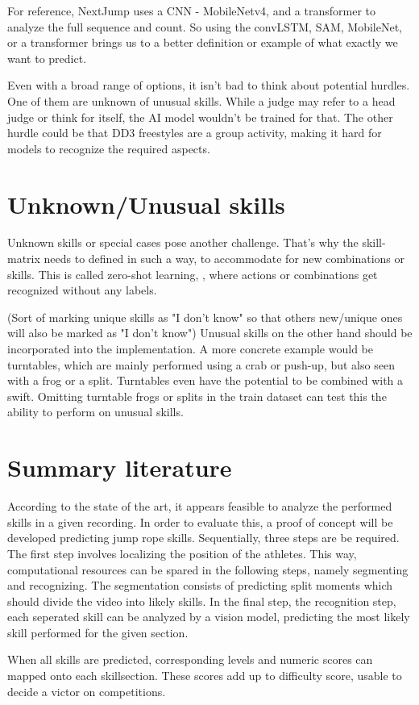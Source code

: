 For reference, NextJump uses a CNN - MobileNetv4, \autocite{MobileNetv4_2024} and a transformer to analyze the full sequence and count. So using the convLSTM, SAM, MobileNet, or a transformer brings us to a better definition or example of what exactly we want to predict.


Even with a broad range of options, it isn't bad to think about potential hurdles. One of them are unknown of unusual skills. While a judge may refer to a head judge or think for itself, the AI model wouldn't be trained for that. The other hurdle could be that DD3 freestyles are a group activity, making it hard for models to recognize the required aspects. 


\section{Unknown/Unusual skills}
\label{lit:unknown-unusual-skills}

Unknown skills or special cases pose another challenge. That's why the skill-matrix needs to defined in such a way, to accommodate for new combinations or skills. This is called zero-shot learning, \autocite{Pourpanah_2022}, where actions or combinations get recognized without any labels.

(Sort of marking unique skills as "I don't know" so that others new/unique ones will also be marked as "I don't know") Unusual skills on the other hand should be incorporated into the implementation.
A more concrete example would be turntables, which are mainly performed using a crab or push-up, but also seen with a frog or a split.
Turntables even have the potential to be combined with a swift. Omitting turntable frogs or splits in the train dataset can test this the ability to perform on unusual skills.

\section{Summary literature}
\label{lit:-summary-literature}

According to the state of the art, it appears feasible to analyze the performed skills in a given recording. In order to evaluate this, a proof of concept will be developed predicting jump rope skills. Sequentially, three steps are be required. The first step involves localizing the position of the athletes. This way, computational resources can be spared in the following steps, namely segmenting and recognizing. The segmentation consists of predicting split moments which should divide the video into likely skills. In the final step, the recognition step, each seperated skill can be analyzed by a vision model, predicting the most likely skill performed for the given section.

When all skills are predicted, corresponding levels and numeric scores can mapped onto each skillsection. These scores add up to difficulty score, usable to decide a victor on competitions.
